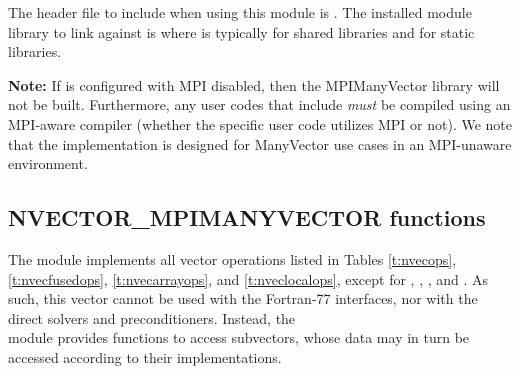 The header file to include when using this module is
. The installed module library to link against is
 where  is typically
 for shared libraries and  for static libraries.

\warn\textbf{Note:} If {\sundials} is configured with MPI disabled, then the
MPIManyVector library will not be built.  Furthermore, any user codes
that include  \emph{must} be compiled
using an MPI-aware compiler (whether the specific user code utilizes
MPI or not).  We note that the {\nvecmanyvector} implementation is
designed for ManyVector use cases in an MPI-unaware environment.


\subsection{NVECTOR\_MPIMANYVECTOR functions}
\label{ss:nvec_mpimanyvector_functions}

The {\nvecmpimanyvector} module implements all vector operations listed 
in Tables \ref{t:nvecops}, \ref{t:nvecfusedops}, \ref{t:nvecarrayops},
and \ref{t:nveclocalops}, except for ,
, , and
.  As such, this vector cannot be
used with the {\sundials} Fortran-77 interfaces, nor with the
{\sundials} direct solvers and preconditioners. Instead, the \\
{\nvecmpimanyvector} module provides functions to access subvectors,
whose data may in turn be accessed according to their {\nvector}
implementations.

